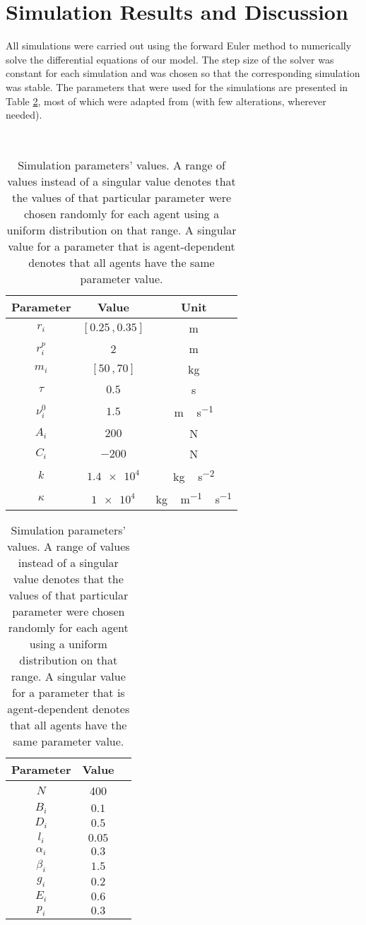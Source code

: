 \section{Simulation Results and Discussion} \label{sec:6-simulation}
All simulations were carried out using the forward Euler method to numerically solve the differential equations of our model. The step size of the solver was constant for each simulation and was chosen so that the corresponding simulation was stable. The parameters that were used for the simulations are presented in Table \ref{tab:param}, most of which were adapted from \cite{Wang2016} (with few alterations, wherever needed).

\begin{table}[ht!]
	\, \hfill
	\begin{tabular}{c c c}
		\hline
		Parameter & Value & Unit \\ \hline
		$r_i$ & $[0.25 \,, 0.35]$ & \si{\meter} \\
		$r_i^p$ & 2 & \si{\meter} \\
		$m_i$ & $[50 \,, 70]$ & \si{\kilogram} \\
		$\tau$ & $0.5$ & \si{\second} \\
		$\nu_i^0$ & $1.5$ & \si{\meter\,\second^{-1}} \\
		$A_i$ & $200$ & \si{\newton} \\
		$C_i$ & $-200$ & \si{\newton} \\
		$k$ & $\num{1.4e4}$ & \si{\kilogram\,\second^{-2}} \\
		$\kappa$ & $\num{1e4}$ & \si{\kilogram\,\meter^{-1}\,\second^{-1}} \\
	\end{tabular}
	\hfill
	\begin{tabular}{c c c}
		\hline
		Parameter & Value & \\ \hline
		$N$ & 400 & \\
		$B_i$ & $0.1$ & \\
		$D_i$ & $0.5$ & \\
		$l_i$ & $0.05$ & \\
		$\alpha_i$ & $0.3$ & \\
		$\beta_i$ & $1.5$ & \\
		$g_i$ & $0.2$ & \\
		$E_i$ & $0.6$ & \\
		$p_i$ & $0.3$ & \\
	\end{tabular}
	\hfill \,
	\caption{Simulation parameters' values. A range of values instead of a singular value denotes that the values of that particular parameter were chosen randomly for each agent using a uniform distribution on that range. A singular value for a parameter that is agent-dependent denotes that all agents have the same parameter value.}
	\label{tab:param}
\end{table}

